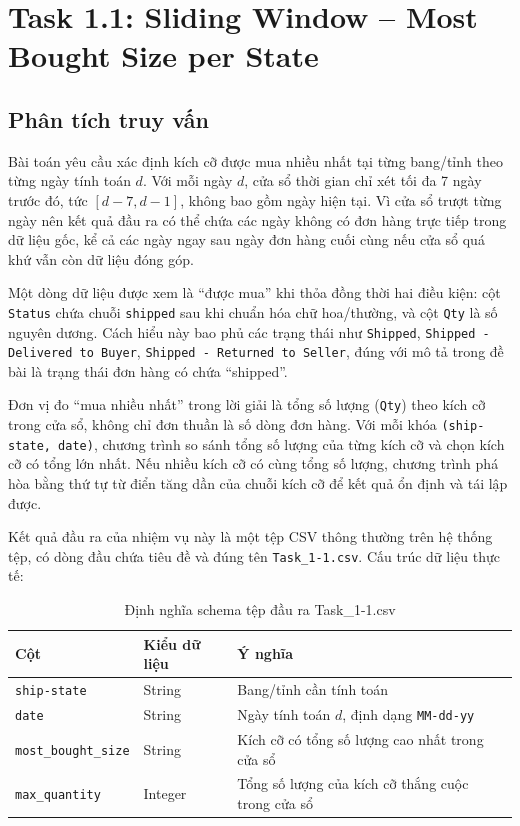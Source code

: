 \section{Task 1.1: Sliding Window -- Most Bought Size per State}

\subsection{Phân tích truy vấn}
Bài toán yêu cầu xác định kích cỡ được mua nhiều nhất tại từng bang/tỉnh theo từng ngày tính toán $d$. Với mỗi ngày $d$, cửa sổ thời gian chỉ xét tối đa 7 ngày trước đó, tức $[d-7, d-1]$, không bao gồm ngày hiện tại. Vì cửa sổ trượt từng ngày nên kết quả đầu ra có thể chứa các ngày không có đơn hàng trực tiếp trong dữ liệu gốc, kể cả các ngày ngay sau ngày đơn hàng cuối cùng nếu cửa sổ quá khứ vẫn còn dữ liệu đóng góp.

Một dòng dữ liệu được xem là ``được mua'' khi thỏa đồng thời hai điều kiện: cột \texttt{Status} chứa chuỗi \texttt{shipped} sau khi chuẩn hóa chữ hoa/thường, và cột \texttt{Qty} là số nguyên dương. Cách hiểu này bao phủ các trạng thái như \texttt{Shipped}, \texttt{Shipped - Delivered to Buyer}, \texttt{Shipped - Returned to Seller}, đúng với mô tả trong đề bài là trạng thái đơn hàng có chứa ``shipped''.

Đơn vị đo ``mua nhiều nhất'' trong lời giải là tổng số lượng (\texttt{Qty}) theo kích cỡ trong cửa sổ, không chỉ đơn thuần là số dòng đơn hàng. Với mỗi khóa \texttt{(ship-state, date)}, chương trình so sánh tổng số lượng của từng kích cỡ và chọn kích cỡ có tổng lớn nhất. Nếu nhiều kích cỡ có cùng tổng số lượng, chương trình phá hòa bằng thứ tự từ điển tăng dần của chuỗi kích cỡ để kết quả ổn định và tái lập được.

Kết quả đầu ra của nhiệm vụ này là một tệp CSV thông thường trên hệ thống tệp, có dòng đầu chứa tiêu đề và đúng tên \texttt{Task\_1-1.csv}. Cấu trúc dữ liệu thực tế:

\begin{table}[H]
\centering
\begin{tabular}{lll}
\toprule
\textbf{Cột} & \textbf{Kiểu dữ liệu} & \textbf{Ý nghĩa} \\
\midrule
\texttt{ship-state} & String & Bang/tỉnh cần tính toán \\
\texttt{date} & String & Ngày tính toán $d$, định dạng \texttt{MM-dd-yy} \\
\texttt{most\_bought\_size} & String & Kích cỡ có tổng số lượng cao nhất trong cửa sổ \\
\texttt{max\_quantity} & Integer & Tổng số lượng của kích cỡ thắng cuộc trong cửa sổ \\
\bottomrule
\end{tabular}
\caption{Định nghĩa schema tệp đầu ra Task\_1-1.csv}
\label{tab:task1_1_schema}
\end{table}


